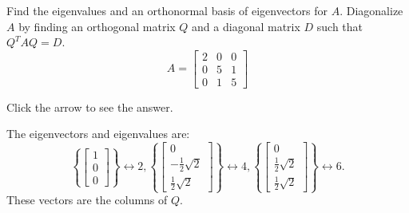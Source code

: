 \documentclass{ximera}
\begin{document}
 \begin{problem}\label{prb:9.8} Find the eigenvalues and an orthonormal basis of eigenvectors for $A.$
Diagonalize $A$ by finding an orthogonal matrix $Q$ and a diagonal matrix $D$
such that $Q^{T}AQ=D$.
\begin{equation*}
A=\left[
\begin{array}{rrr}
2 & 0 & 0 \\
0 & 5 & 1 \\
0 & 1 & 5
\end{array}
\right]
\end{equation*}

Click the arrow to see the answer. \begin{expandable}
The eigenvectors and eigenvalues are:
\[
\left\{ \left[
\begin{array}{c}
1 \\
0 \\
0
\end{array}
\right] \right\} \leftrightarrow 2,\left\{ \left[
\begin{array}{c}
0 \\
-\frac{1}{2}\sqrt{2} \\
\frac{1}{2}\sqrt{2}
\end{array}
\right] \right\} \leftrightarrow 4,\left\{ \left[
\begin{array}{c}
0 \\
\frac{1}{2}\sqrt{2} \\
\frac{1}{2}\sqrt{2}
\end{array}
\right] \right\} \leftrightarrow 6.
\]
These vectors are the columns of $Q$.
\end{expandable} 
\end{problem}
\end{document}
